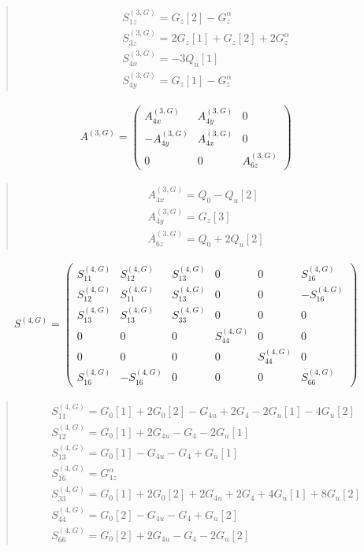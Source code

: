 \documentclass[fleqn,10pt]{jsarticle}
\begin{document}
\begin{quote}
\begin{align*}
& S^{(3,G)}_{1z} = G_{z}[2] - G_{z}^{\alpha} \\
& S^{(3,G)}_{3z} = 2 G_{z}[1] + G_{z}[2] + 2 G_{z}^{\alpha} \\
& S^{(3,G)}_{4x} = - 3 Q_{u}[1] \\
& S^{(3,G)}_{4y} = G_{z}[1] - G_{z}^{\alpha}
\end{align*}
\end{quote}
\begin{align*}
A^{(3,G)} = \begin{pmatrix} A^{(3,G)}_{4x} & A^{(3,G)}_{4y} & 0 \\ - A^{(3,G)}_{4y} & A^{(3,G)}_{4x} & 0 \\ 0 & 0 & A^{(3,G)}_{6z} \end{pmatrix}
\end{align*}
\begin{quote}
\begin{align*}
& A^{(3,G)}_{4x} = Q_{0} - Q_{u}[2] \\
& A^{(3,G)}_{4y} = G_{z}[3] \\
& A^{(3,G)}_{6z} = Q_{0} + 2 Q_{u}[2]
\end{align*}
\end{quote}
\begin{align*}
S^{(4,G)} = \begin{pmatrix} S^{(4,G)}_{11} & S^{(4,G)}_{12} & S^{(4,G)}_{13} & 0 & 0 & S^{(4,G)}_{16} \\ S^{(4,G)}_{12} & S^{(4,G)}_{11} & S^{(4,G)}_{13} & 0 & 0 & - S^{(4,G)}_{16} \\ S^{(4,G)}_{13} & S^{(4,G)}_{13} & S^{(4,G)}_{33} & 0 & 0 & 0 \\ 0 & 0 & 0 & S^{(4,G)}_{44} & 0 & 0 \\ 0 & 0 & 0 & 0 & S^{(4,G)}_{44} & 0 \\ S^{(4,G)}_{16} & - S^{(4,G)}_{16} & 0 & 0 & 0 & S^{(4,G)}_{66} \end{pmatrix}
\end{align*}
\begin{quote}
\begin{align*}
& S^{(4,G)}_{11} = G_{0}[1] + 2 G_{0}[2] - G_{4u} + 2 G_{4} - 2 G_{u}[1] - 4 G_{u}[2] \\
& S^{(4,G)}_{12} = G_{0}[1] + 2 G_{4u} - G_{4} - 2 G_{u}[1] \\
& S^{(4,G)}_{13} = G_{0}[1] - G_{4u} - G_{4} + G_{u}[1] \\
& S^{(4,G)}_{16} = G_{4z}^{\alpha} \\
& S^{(4,G)}_{33} = G_{0}[1] + 2 G_{0}[2] + 2 G_{4u} + 2 G_{4} + 4 G_{u}[1] + 8 G_{u}[2] \\
& S^{(4,G)}_{44} = G_{0}[2] - G_{4u} - G_{4} + G_{u}[2] \\
& S^{(4,G)}_{66} = G_{0}[2] + 2 G_{4u} - G_{4} - 2 G_{u}[2]
\end{align*}
\end{quote}
\end{document}
